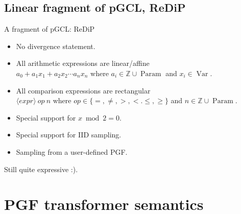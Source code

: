 \documentclass[8pt]{beamer}
\DeclareMathOperator*{\VARS}{Var}
\DeclareMathOperator*{\PARMS}{Param}
\begin{document}
\subsection{Linear fragment of pGCL, ReDiP}
\begin{frame}{A fragment of pGCL: ReDiP}
	\begin{itemize}
		\item No divergence statement.
		\item All arithmetic expressions are linear/affine\\
		      \( a_0 + a_1 x_1 + a_2 x_2 \cdots a_n x_n \)
		      where \( a_i \in \mathbb{Z} \cup \PARMS \) and \( x_i \in \VARS \).
		\item All comparison expressions are rectangular\\
		      \(\langle expr \rangle\ op\ n\)
		      where \(op \in \{=,\neq,>,<.\leq,\geq\}\) and \(n\in \mathbb{Z}\cup\PARMS\).
		\item Special support for \(x \bmod 2 = 0\).
		\item Special support for IID sampling.
		\item Sampling from a user-defined PGF.
	\end{itemize}
	\hfill
	Still quite expressive :).
\end{frame}

\section{PGF transformer semantics}
\end{document}

